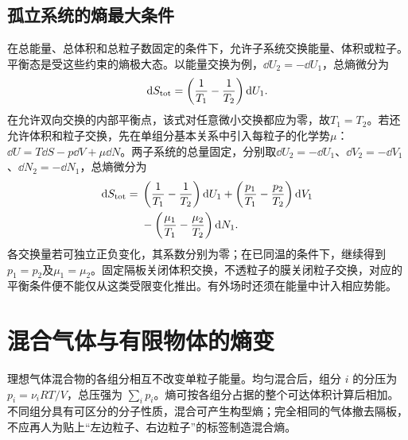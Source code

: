 \subsection{孤立系统的熵最大条件}
\label{th:maxentropy}
在总能量、总体积和总粒子数固定的条件下，允许子系统交换能量、体积或粒子。平衡态是受这些约束的熵极大态。以能量交换为例，$\dd U_2=-\dd U_1$，总熵微分为
\[
 \mathop{}\!\mathrm d S_{\rm tot}=\left(\frac1{T_1}-\frac1{T_2}\right)\mathop{}\!\mathrm d U_1.
\]
在允许双向交换的内部平衡点，该式对任意微小交换都应为零，故$T_1=T_2$。若还允许体积和粒子交换，先在单组分基本关系中引入每粒子的化学势$\mu$：$\dd U=T\dd S-p\dd V+\mu\dd N$。两子系统的总量固定，分别取$\dd U_2=-\dd U_1$、$\dd V_2=-\dd V_1$、$\dd N_2=-\dd N_1$，总熵微分为
\[
 \begin{aligned}
 \mathop{}\!\mathrm d S_{\rm tot}={}&\left(\frac1{T_1}-\frac1{T_2}\right)\mathop{}\!\mathrm d U_1
 +\left(\frac{p_1}{T_1}-\frac{p_2}{T_2}\right)\mathop{}\!\mathrm d V_1\\
 &-\left(\frac{\mu_1}{T_1}-\frac{\mu_2}{T_2}\right)\mathop{}\!\mathrm d N_1.
 \end{aligned}
\]
各交换量若可独立正负变化，其系数分别为零；在已同温的条件下，继续得到$p_1=p_2$及$\mu_1=\mu_2$。固定隔板关闭体积交换，不透粒子的膜关闭粒子交换，对应的平衡条件便不能仅从这类受限变化推出。有外场时还须在能量中计入相应势能。

\section{混合气体与有限物体的熵变}
\label{th:mixing}
理想气体混合物的各组分相互不改变单粒子能量。均匀混合后，组分 $i$ 的分压为 $p_i=\nu_iRT/V$，总压强为 $\sum_i p_i$。熵可按各组分占据的整个可达体积计算后相加。不同组分具有可区分的分子性质，混合可产生构型熵；完全相同的气体撤去隔板，不应再人为贴上“左边粒子、右边粒子”的标签制造混合熵。

